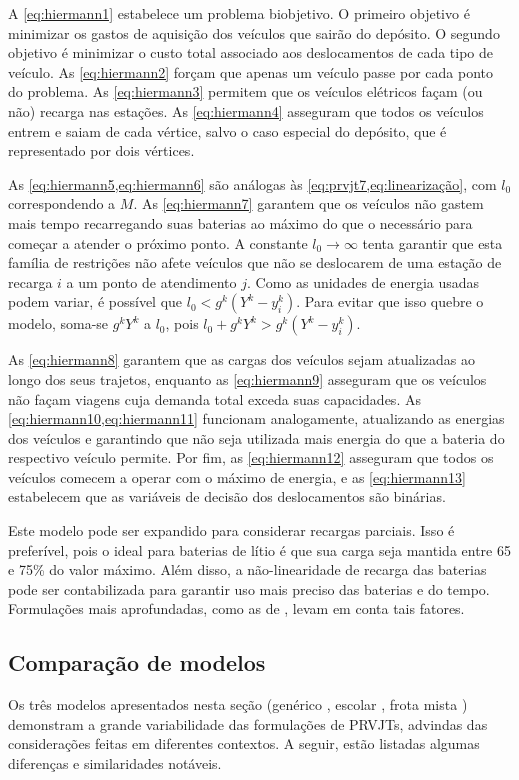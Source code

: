 A \cref{eq:hiermann1} estabelece um problema biobjetivo. O primeiro objetivo é minimizar os gastos de aquisição dos veículos que sairão do depósito. O segundo objetivo é minimizar o custo total associado aos deslocamentos de cada tipo de veículo. As \cref{eq:hiermann2} forçam que apenas um veículo passe por cada ponto do problema. As \cref{eq:hiermann3} permitem que os veículos elétricos façam (ou não) recarga nas estações. As \cref{eq:hiermann4} asseguram que todos os veículos entrem e saiam de cada vértice, salvo o caso especial do depósito, que é representado por dois vértices.

As \cref{eq:hiermann5,eq:hiermann6} são análogas às \cref{eq:prvjt7,eq:linearização}, com $l_0$ correspondendo a $M$. As \cref{eq:hiermann7} garantem que os veículos não gastem mais tempo recarregando suas baterias ao máximo do que o necessário para começar a atender o próximo ponto. A constante $l_0 \to \infty$ tenta garantir que esta família de restrições não afete veículos que não se deslocarem de uma estação de recarga $i$ a um ponto de atendimento $j$. Como as unidades de energia usadas podem variar, é possível que $l_0 < g^k(Y^k - y_i^k)$. Para evitar que isso quebre o modelo, soma-se $g^kY^k$ a $l_0$, pois $l_0 + g^kY^k > g^k(Y^k - y_i^k)$.

As \cref{eq:hiermann8} garantem que as cargas dos veículos sejam atualizadas ao longo dos seus trajetos, enquanto as \cref{eq:hiermann9} asseguram que os veículos não façam viagens cuja demanda total exceda suas capacidades. As \cref{eq:hiermann10,eq:hiermann11} funcionam analogamente, atualizando as energias dos veículos e garantindo que não seja utilizada mais energia do que a bateria do respectivo veículo permite. Por fim, as \cref{eq:hiermann12} asseguram que todos os veículos comecem a operar com o máximo de energia, e as \cref{eq:hiermann13} estabelecem que as variáveis de decisão dos deslocamentos são binárias.

Este modelo pode ser expandido para considerar recargas parciais. Isso é preferível, pois o ideal para baterias de lítio é que sua carga seja mantida entre 65 e 75\% do valor máximo. Além disso, a não-linearidade de recarga das baterias pode ser contabilizada para garantir uso mais preciso das baterias e do tempo. Formulações mais aprofundadas, como as de \textcite{CATALDO:22,ZHANG:21,HELLMARK:22,ZUO:19}, levam em conta tais fatores.

\subsection{Comparação de modelos}
Os três modelos apresentados nesta seção (genérico \cite{VIEIRA:13}, escolar \cite{FÜGENSCHUH:04}, frota mista \cite{HIERMANN:16}) demonstram a grande variabilidade das formulações de PRVJTs, advindas das considerações feitas em diferentes contextos. A seguir, estão listadas algumas diferenças e similaridades notáveis.

